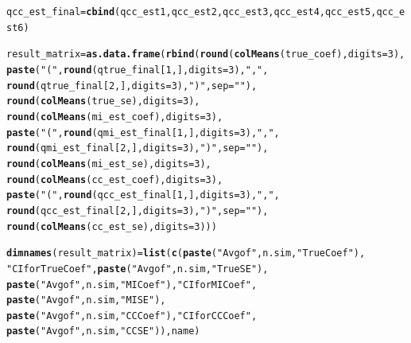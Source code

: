 \documentclass[fleqn,10pt]{wlscirep}\usepackage[]{graphicx}\usepackage[]{color}
\makeatletter
\newcommand{\hlnum}[1]{\textcolor[rgb]{0.686,0.059,0.569}{#1}}%
\newcommand{\hlstr}[1]{\textcolor[rgb]{0.192,0.494,0.8}{#1}}%
\newcommand{\hlstd}[1]{\textcolor[rgb]{0.345,0.345,0.345}{#1}}%
\newcommand{\hlkwb}[1]{\textcolor[rgb]{0.69,0.353,0.396}{#1}}%
\newcommand{\hlkwc}[1]{\textcolor[rgb]{0.333,0.667,0.333}{#1}}%
\newcommand{\hlkwd}[1]{\textcolor[rgb]{0.737,0.353,0.396}{\textbf{#1}}}%
\newenvironment{kframe}{%
 \def\at@end@of@kframe{}%
 \ifinner\ifhmode%
  \def\at@end@of@kframe{\end{minipage}}%
  \begin{minipage}{\columnwidth}%
 \fi\fi%
 \def\FrameCommand##1{\hskip\@totalleftmargin \hskip-\fboxsep
 \colorbox{shadecolor}{##1}\hskip-\fboxsep
     \hskip-\linewidth \hskip-\@totalleftmargin \hskip\columnwidth}%
 \MakeFramed {\advance\hsize-\width
   \@totalleftmargin\z@ \linewidth\hsize
   \@setminipage}}%
 {\par\unskip\endMakeFramed%
 \at@end@of@kframe}
\newenvironment{knitrout}{}{} %
\makeatother
\begin{document}
\begin{knitrout}
\begin{kframe}
\begin{alltt}
    \hlstd{qcc_est_final} \hlkwb{=} \hlkwd{cbind}\hlstd{(qcc_est1, qcc_est2, qcc_est3, qcc_est4, qcc_est5, qcc_est6)}


    \hlstd{result_matrix} \hlkwb{=} \hlkwd{as.data.frame}\hlstd{(}\hlkwd{rbind}\hlstd{(}\hlkwd{round}\hlstd{(}\hlkwd{colMeans}\hlstd{(true_coef),} \hlkwc{digits} \hlstd{=} \hlnum{3}\hlstd{),}
                                    \hlkwd{paste}\hlstd{(}\hlstr{"("}\hlstd{,}\hlkwd{round}\hlstd{(qtrue_final[}\hlnum{1}\hlstd{,],} \hlkwc{digits} \hlstd{=} \hlnum{3}\hlstd{),}\hlstr{","}\hlstd{,}
                                        \hlkwd{round}\hlstd{(qtrue_final[}\hlnum{2}\hlstd{,],} \hlkwc{digits} \hlstd{=} \hlnum{3}\hlstd{),}\hlstr{")"}\hlstd{,} \hlkwc{sep} \hlstd{=} \hlstr{""}\hlstd{),}
                                        \hlkwd{round}\hlstd{(}\hlkwd{colMeans}\hlstd{(true_se),} \hlkwc{digits} \hlstd{=} \hlnum{3}\hlstd{),}
                                        \hlkwd{round}\hlstd{(}\hlkwd{colMeans}\hlstd{(mi_est_coef),} \hlkwc{digits} \hlstd{=} \hlnum{3}\hlstd{),}
                                    \hlkwd{paste}\hlstd{(}\hlstr{"("}\hlstd{,}\hlkwd{round}\hlstd{(qmi_est_final[}\hlnum{1}\hlstd{,],} \hlkwc{digits} \hlstd{=} \hlnum{3}\hlstd{),}\hlstr{","}\hlstd{,}
                                      \hlkwd{round}\hlstd{(qmi_est_final[}\hlnum{2}\hlstd{,],} \hlkwc{digits} \hlstd{=} \hlnum{3}\hlstd{),}\hlstr{")"}\hlstd{,} \hlkwc{sep} \hlstd{=} \hlstr{""}\hlstd{),}
                                        \hlkwd{round}\hlstd{(}\hlkwd{colMeans}\hlstd{(mi_est_se),} \hlkwc{digits} \hlstd{=} \hlnum{3}\hlstd{),}
                                        \hlkwd{round}\hlstd{(}\hlkwd{colMeans}\hlstd{(cc_est_coef),} \hlkwc{digits} \hlstd{=} \hlnum{3}\hlstd{),}
                                    \hlkwd{paste}\hlstd{(}\hlstr{"("}\hlstd{,}\hlkwd{round}\hlstd{(qcc_est_final[}\hlnum{1}\hlstd{,],} \hlkwc{digits} \hlstd{=} \hlnum{3}\hlstd{),}\hlstr{","}\hlstd{,}
                                      \hlkwd{round}\hlstd{(qcc_est_final[}\hlnum{2}\hlstd{,],} \hlkwc{digits} \hlstd{=} \hlnum{3}\hlstd{),}\hlstr{")"}\hlstd{,} \hlkwc{sep} \hlstd{=} \hlstr{""}\hlstd{),}
                                        \hlkwd{round}\hlstd{(}\hlkwd{colMeans}\hlstd{(cc_est_se),} \hlkwc{digits} \hlstd{=} \hlnum{3}\hlstd{)))}

    \hlkwd{dimnames}\hlstd{(result_matrix)} \hlkwb{=} \hlkwd{list}\hlstd{(}\hlkwd{c}\hlstd{(}\hlkwd{paste}\hlstd{(}\hlstr{"Avg of"}\hlstd{, n.sim,} \hlstr{"True Coef"}\hlstd{),}
                                     \hlstr{"CI for True Coef"}\hlstd{,} \hlkwd{paste}\hlstd{(}\hlstr{"Avg of"}\hlstd{, n.sim,} \hlstr{"True SE"}\hlstd{),}
                                  \hlkwd{paste}\hlstd{(}\hlstr{"Avg of"}\hlstd{, n.sim,} \hlstr{"MI Coef"}\hlstd{),} \hlstr{"CI for MI Coef"}\hlstd{,}
                                  \hlkwd{paste}\hlstd{(}\hlstr{"Avg of"}\hlstd{, n.sim,} \hlstr{"MI SE"}\hlstd{),}
                                  \hlkwd{paste}\hlstd{(}\hlstr{"Avg of"}\hlstd{, n.sim,} \hlstr{"CC Coef"}\hlstd{),} \hlstr{"CI for CC Coef"}\hlstd{,}
                                  \hlkwd{paste}\hlstd{(}\hlstr{"Avg of"}\hlstd{, n.sim,} \hlstr{"CC SE"}\hlstd{)), name)}


\end{alltt}
\end{kframe}
\end{knitrout}
\end{document}
